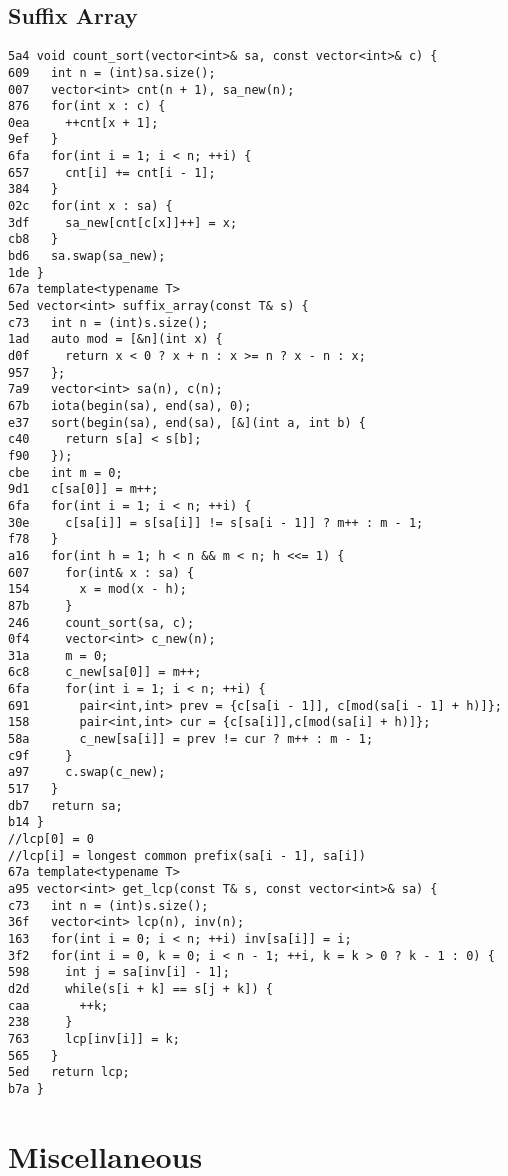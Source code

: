 \documentclass[10pt, a4paper, twoside]{article}
\begin{document}
\subsection{Suffix Array}
\begin{lstlisting}
5a4 void count_sort(vector<int>& sa, const vector<int>& c) {
609   int n = (int)sa.size();
007   vector<int> cnt(n + 1), sa_new(n);
876   for(int x : c) {
0ea     ++cnt[x + 1];
9ef   }
6fa   for(int i = 1; i < n; ++i) {
657     cnt[i] += cnt[i - 1];
384   }
02c   for(int x : sa) {
3df     sa_new[cnt[c[x]]++] = x;
cb8   }
bd6   sa.swap(sa_new);
1de }
67a template<typename T>
5ed vector<int> suffix_array(const T& s) {
c73   int n = (int)s.size();
1ad   auto mod = [&n](int x) { 
d0f     return x < 0 ? x + n : x >= n ? x - n : x;
957   };
7a9   vector<int> sa(n), c(n);
67b   iota(begin(sa), end(sa), 0);
e37   sort(begin(sa), end(sa), [&](int a, int b) {
c40     return s[a] < s[b];
f90   });
cbe   int m = 0;
9d1   c[sa[0]] = m++;
6fa   for(int i = 1; i < n; ++i) {
30e     c[sa[i]] = s[sa[i]] != s[sa[i - 1]] ? m++ : m - 1;
f78   }
a16   for(int h = 1; h < n && m < n; h <<= 1) {
607     for(int& x : sa) {
154       x = mod(x - h);
87b     }
246     count_sort(sa, c);
0f4     vector<int> c_new(n);
31a     m = 0;
6c8     c_new[sa[0]] = m++;
6fa     for(int i = 1; i < n; ++i) {
691       pair<int,int> prev = {c[sa[i - 1]], c[mod(sa[i - 1] + h)]};
158       pair<int,int> cur = {c[sa[i]],c[mod(sa[i] + h)]};
58a       c_new[sa[i]] = prev != cur ? m++ : m - 1;
c9f     }
a97     c.swap(c_new);
517   }
db7   return sa;
b14 }
//lcp[0] = 0
//lcp[i] = longest common prefix(sa[i - 1], sa[i])
67a template<typename T>
a95 vector<int> get_lcp(const T& s, const vector<int>& sa) {
c73   int n = (int)s.size();
36f   vector<int> lcp(n), inv(n);
163   for(int i = 0; i < n; ++i) inv[sa[i]] = i;
3f2   for(int i = 0, k = 0; i < n - 1; ++i, k = k > 0 ? k - 1 : 0) {
598     int j = sa[inv[i] - 1];
d2d     while(s[i + k] == s[j + k]) {
caa       ++k;
238     }
763     lcp[inv[i]] = k;
565   }
5ed   return lcp;
b7a }
\end{lstlisting}



%
%

\section{Miscellaneous}
\end{document}

